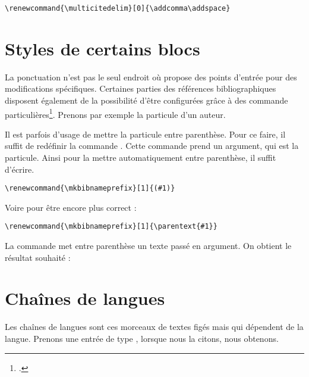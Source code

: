 \begin{verbatim}
\renewcommand{\multicitedelim}[0]{\addcomma\addspace}
\end{verbatim}

\section{Styles de certains blocs}

La ponctuation n'est pas le seul endroit où  propose des points d'entrée pour des modifications spécifiques. Certaines parties des références bibliographiques disposent également de la possibilité d'être configurées grâce à des commande particulières\footcite{biblatex_hooks}. Prenons par exemple la particule d'un auteur.
	
	\begin{quotation}
	\cite{BeauvoirSexe}
	\end{quotation}
	
	\renewcommand{\mkbibnameprefix}[1]{\parentext{#1}}
	
Il est parfois d'usage de mettre la particule entre parenthèse. Pour ce faire, il suffit de redéfinir la commande . Cette commande prend un argument, qui est la particule. Ainsi pour la mettre automatiquement entre parenthèse, il suffit d'écrire.
	
	\begin{verbatim}
\renewcommand{\mkbibnameprefix}[1]{(#1)}
	\end{verbatim}
	
Voire pour être encore plus correct :
	
	\begin{verbatim}
\renewcommand{\mkbibnameprefix}[1]{\parentext{#1}}
	\end{verbatim}

La commande  met entre parenthèse un texte passé en argument. On obtient le résultat souhaité : 

	\begin{quotation}
	\cite{BeauvoirSexe}
	\end{quotation}

\section{Chaînes de langues}\label{i18nchaines}
	
	Les chaînes de langues sont ces morceaux de textes figés mais qui dépendent de la langue. Prenons une entrée de type , lorsque nous la citons, nous obtenons.
	
